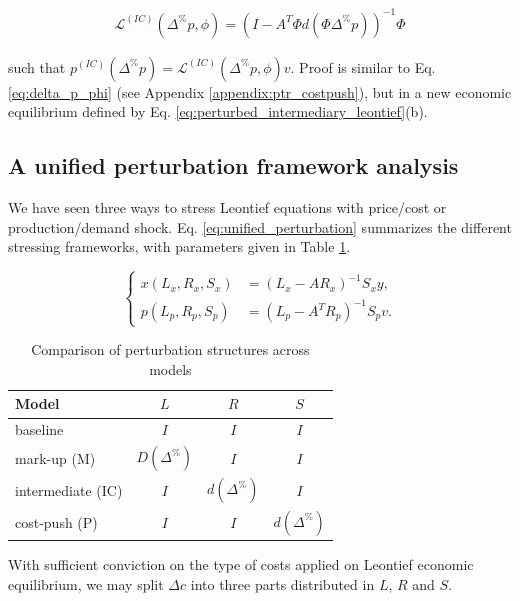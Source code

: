 \documentclass{article}
\begin{document}
\begin{align}
\label{eq:perturbed_intermediary_leontief_phi}
    \mathcal{L}^{(IC)}(\Delta^\% p, \phi)  = \left( I - A^T \Phi d(\Phi \Delta^\% p) \right)^{-1} \Phi
\end{align}

\noindent such that $p^{(IC)}(\Delta^\% p)=\mathcal{L}^{(IC)}(\Delta^\% p, \phi) v$. Proof is similar to Eq. \eqref{eq:delta_p_phi} (see Appendix \ref{appendix:ptr_costpush}), but in a new economic equilibrium defined by Eq. \eqref{eq:perturbed_intermediary_leontief}(b). 

\subsection{A unified perturbation framework analysis}
\label{sec:unified_framework}

We have seen three ways to stress Leontief equations with price/cost or production/demand shock. Eq. \eqref{eq:unified_perturbation} summarizes the different stressing frameworks, with parameters given in Table \ref{tab:perturbation_models}. 

\begin{equation}
\label{eq:unified_perturbation}
\left\{
\begin{aligned}
x(L_x,R_x,S_x) &= (L_x - A R_x)^{-1} S_x y, \\ 
p(L_p,R_p,S_p) &= (L_p - A^T R_p)^{-1} S_p v.
\end{aligned}
\right.
\end{equation}


\begin{table}[h!]
\centering
\begin{tabular}{lccc}
\hline
Model & $L$ & $R$ & $S$ \\
\hline
baseline     & $I$ & $I$ & $I$ \\
mark-up (M)      & $D(\Delta^{\%})$ & $I$ & $I$ \\
intermediate (IC) & $I$ & $d(\Delta^{\%})$ & $I$ \\
cost-push (P)   & $I$ & $I$ & $d(\Delta^{\%})$ \\
\hline
\end{tabular}
\caption{Comparison of perturbation structures across models}
\label{tab:perturbation_models}
\end{table}

\noindent With sufficient conviction on the type of costs applied on Leontief economic equilibrium, we may split $\Delta c$ into three parts distributed in $L$, $R$ and $S$. 
\end{document}
